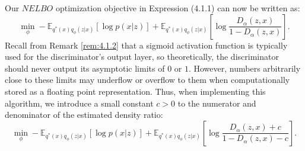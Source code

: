 \documentclass[honours,12pt]{unswthesis}
\numberwithin{equation}{section}
\theoremstyle{definition}
\begin{document}
Our $NELBO$ optimization objective in Expression (4.1.1) can now be written as:
\begin{equation}
\min_\phi -\mathbb{E}_{q^*(x)q_\phi(z|x)}[\log p(x|z)]+\mathbb{E}_{q^*(x)q_\phi(z|x)}\left[\log \frac{D_\alpha(z,x)}{1-D_\alpha(z,x)}\right].
\end{equation}
Recall from Remark \ref{rem:4.1.2} that a sigmoid activation function is typically used for the discriminator's output layer, so theoretically, the discriminator should never output its asymptotic limits of $0$ or $1$. However, numbers arbitrarily close to these limits may underflow or overflow to them when computationally stored as a floating point representation. Thus, when implementing this algorithm, we introduce a small constant $c>0$ to the numerator and denominator of the estimated density ratio:
\[\min_\phi -\mathbb{E}_{q^*(x)q_\phi(z|x)}[\log p(x|z)]+\mathbb{E}_{q^*(x)q_\phi(z|x)}\left[\log \frac{D_\alpha(z,x)+c}{1-D_\alpha(z,x)-c}\right].\]
\end{document}
